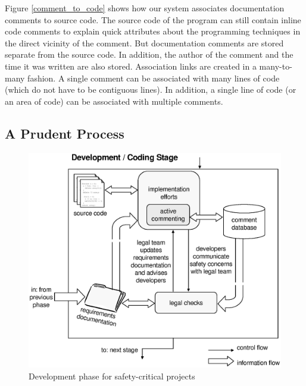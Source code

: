 Figure \ref{comment_to_code} shows how our system associates documentation
comments to source code. The source code of the program can still contain inline
code comments to explain quick attributes about the programming techniques in
the direct vicinity of the comment. But documentation comments are stored
separate from the source code. In addition, the author of the comment and the
time it was written are also stored. Association links are created in a
many-to-many fashion. A single comment can be associated with many lines of code
(which do not have to be contiguous lines). In addition, a single line of code
(or an area of code) can be associated with multiple comments.

\subsection{A Prudent Process}

\begin{figure}
\begin{narrow}{-1.25in}{0in}
\begin{center}
\includegraphics[scale=0.75]{images/prudence.eps}
\end{center}
\end{narrow}
\caption{Development phase for safety-critical projects}
\label{prudence}
\end{figure}

